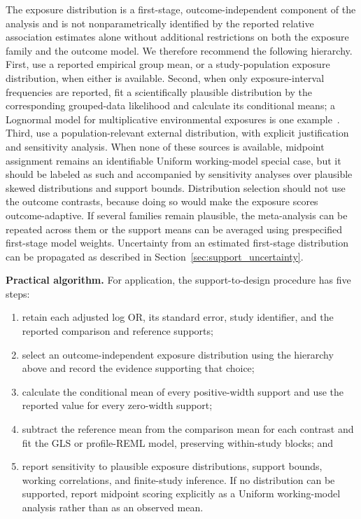 \documentclass[journal=rsm]{CUP-JNL-DTM}%
\theoremstyle{definition}
\numberwithin{equation}{section}
\begin{document}
The exposure distribution is a first-stage, outcome-independent component of
the analysis and is not nonparametrically identified by the reported relative
association estimates alone without additional restrictions on both the
exposure family and the outcome model. We therefore recommend the following hierarchy. First, use a
reported empirical group mean, or a study-population exposure distribution,
when either is available. Second, when only exposure-interval frequencies are
reported, fit a scientifically plausible distribution by the corresponding
grouped-data likelihood and calculate its conditional means; a Lognormal model
for multiplicative environmental exposures is one example~\cite{Allen2020}.
Third, use a population-relevant external distribution, with explicit
justification and sensitivity analysis. When none of these sources is
available, midpoint assignment remains an identifiable Uniform working-model
special case, but it should be labeled as such and accompanied by sensitivity
analyses over plausible skewed distributions and support bounds. Distribution
selection should not use the outcome contrasts, because doing so would make the
exposure scores outcome-adaptive. If several families remain plausible, the
meta-analysis can be repeated across them or the support means can be averaged
using prespecified first-stage model weights. Uncertainty from an estimated
first-stage distribution can be propagated as described in
Section~\ref{sec:support_uncertainty}.

\noindent\textbf{Practical algorithm.}
For application, the support-to-design procedure has five steps:
\begin{enumerate}
\item retain each adjusted log OR, its standard error, study identifier, and
the reported comparison and reference supports;
\item select an outcome-independent exposure distribution using the hierarchy
above and record the evidence supporting that choice;
\item calculate the conditional mean of every positive-width support and use
the reported value for every zero-width support;
\item subtract the reference mean from the comparison mean for each contrast
and fit the GLS or profile-REML model, preserving within-study blocks; and
\item report sensitivity to plausible exposure distributions, support bounds,
working correlations, and finite-study inference. If no distribution can be
supported, report midpoint scoring explicitly as a Uniform working-model
analysis rather than as an observed mean.
\end{enumerate}
\end{document}
